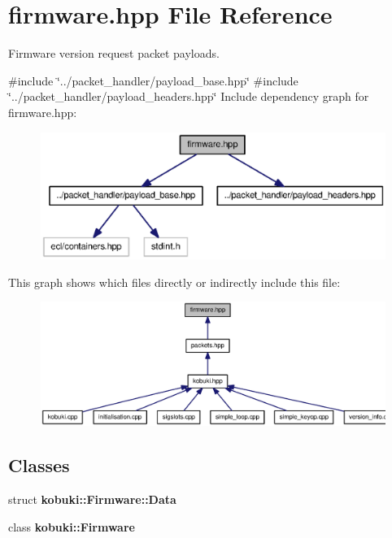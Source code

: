 \section{firmware.\-hpp \-File \-Reference}
\label{firmware_8hpp}


\-Firmware version request packet payloads.  


{\ttfamily \#include \char`\"{}../packet\-\_\-handler/payload\-\_\-base.\-hpp\char`\"{}}\*
{\ttfamily \#include \char`\"{}../packet\-\_\-handler/payload\-\_\-headers.\-hpp\char`\"{}}\*
\-Include dependency graph for firmware.\-hpp\-:
\nopagebreak
\begin{figure}[H]
\begin{center}
\leavevmode
\includegraphics[width=350pt]{firmware_8hpp__incl}
\end{center}
\end{figure}
\-This graph shows which files directly or indirectly include this file\-:
\nopagebreak
\begin{figure}[H]
\begin{center}
\leavevmode
\includegraphics[width=350pt]{firmware_8hpp__dep__incl}
\end{center}
\end{figure}
\subsection*{\-Classes}
\begin{DoxyCompactItemize}
\item 
struct {\bf kobuki\-::\-Firmware\-::\-Data}
\item 
class {\bf kobuki\-::\-Firmware}
\end{DoxyCompactItemize}
